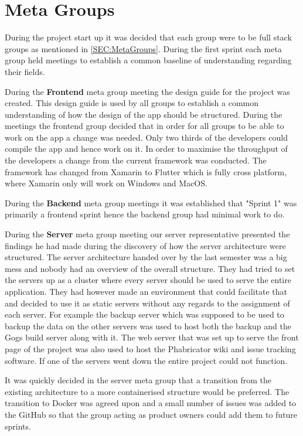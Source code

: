 \section{Meta Groups}
During the project start up it was decided that each group were to be full stack groups as mentioned in \autoref{SEC:MetaGroups}. 
During the first sprint each meta group held meetings to establish a common baseline of understanding regarding their fields. 

During the \textbf{Frontend} meta group meeting the design guide for the project was created. 
This design guide is used by all groups to establish a common understanding of how the design of the app should be structured. 
During the meetings the frontend group decided that in order for all groups to be able to work on the app a change was needed. 
Only two thirds of the developers could compile the app and hence work on it. 
In order to maximise the throughput of the developers a change from the current framework was conducted.
The framework has changed from Xamarin to Flutter which is fully cross platform, where Xamarin only will work on Windows and MacOS. 

During the \textbf{Backend} meta group meetings it was established that "Sprint 1" was primarily a frontend sprint hence the backend group had minimal work to do. 

During the \textbf{Server} meta group meeting our server representative presented the findings he had made during the discovery of how the server architecture were structured. 
The server architecture handed over by the last semester was a big mess and nobody had an overview of the overall structure.
They had tried to set the servers up as a cluster where every server should be used to serve the entire application. 
They had however made an environment that could facilitate that and decided to use it as static servers without any regards to the assignment of each server. 
For example the backup server which was supposed to be used to backup the data on the other servers was used to host both the backup and the Gogs build server along with it. 
The web server that was set up to serve the front page of the project was also used to host the Phabricator wiki and issue tracking software.
If one of the servers went down the entire project could not function. 

It was quickly decided in the server meta group that a transition from the existing architecture to a more containerised structure would be preferred. 
The transition to Docker was agreed upon and a small number of issues was added to the GitHub so that the group acting as product owners could add them to future sprints. 
